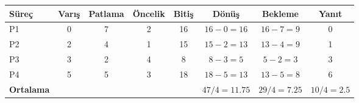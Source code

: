 \begin{tabular}{@{}lccccccc@{}}
\toprule
\textbf{Süreç} & \textbf{Varış} & \textbf{Patlama} & \textbf{Öncelik} & \textbf{Bitiş} & \textbf{Dönüş} & \textbf{Bekleme} & \textbf{Yanıt}\\
\midrule
P1 & 0 & 7 & 2 & 16 & $16-0=16$ & $16-7=9$ & 0\\
P2 & 2 & 4 & 1 & 15 & $15-2=13$ & $13-4=9$ & 1\\
P3 & 3 & 2 & 4 & 8 & $8-3=5$ & $5-2=3$ & 3\\
P4 & 5 & 5 & 3 & 18 & $18-5=13$ & $13-5=8$ & 6\\
\midrule
\textbf{Ortalama} &  &  &  &  & $47/4=11.75$ & $29/4=7.25$ & $10/4=2.5$\\
\bottomrule
\end{tabular}
